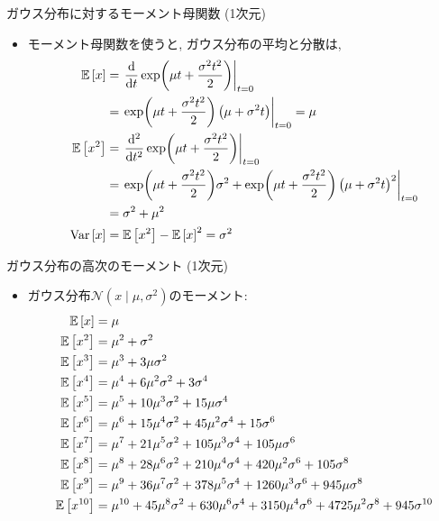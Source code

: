 \documentclass[dvipdfmx,notheorems,t]{beamer}
\begin{document}
\begin{frame}{ガウス分布に対するモーメント母関数 (1次元)}
\begin{itemize}
  \item モーメント母関数を使うと, ガウス分布の平均と分散は,
  \begin{align*}
    \operatorname{\mathbb{E}} \left[ x \right] &= \left. \dv{t} \exp(\mu t + \frac{\sigma^2 t^2}{2}) \right|_{t = 0} \\
      &= \left. \exp(\mu t + \frac{\sigma^2 t^2}{2}) \left( \mu + \sigma^2 t \right) \right|_{t = 0}
      = \mu \\
    \operatorname{\mathbb{E}} \left[ x^2 \right] &= \left. \dv[2]{t} \exp(\mu t + \frac{\sigma^2 t^2}{2}) \right|_{t = 0} \\
      &= \left. \exp(\mu t + \frac{\sigma^2 t^2}{2}) \sigma^2 +
        \exp(\mu t + \frac{\sigma^2 t^2}{2}) \left( \mu + \sigma^2 t \right)^2 \right|_{t = 0} \\
      &= \sigma^2 + \mu^2 \\
    \operatorname{Var} \left[ x \right] &= \operatorname{\mathbb{E}} \left[ x^2 \right] - \operatorname{\mathbb{E}} \left[ x \right]^2 = \sigma^2
  \end{align*}
\end{itemize}
\end{frame}

\begin{frame}{ガウス分布の高次のモーメント (1次元)}
\begin{itemize}
  \item ガウス分布$\mathcal{N}(x \mid \mu, \sigma^2)$のモーメント:
  \begin{align*}
    \operatorname{\mathbb{E}} \left[ x \right] &= \mu \\
    \operatorname{\mathbb{E}} \left[ x^2 \right] &= \mu^2 + \sigma^2 \\
    \operatorname{\mathbb{E}} \left[ x^3 \right] &= \mu^3 + 3 \mu \sigma^2 \\
    \operatorname{\mathbb{E}} \left[ x^4 \right] &= \mu^4 + 6 \mu^2 \sigma^2 + 3 \sigma^4 \\
    \operatorname{\mathbb{E}} \left[ x^5 \right] &= \mu^5 + 10 \mu^3 \sigma^2 + 15 \mu \sigma^4 \\
    \operatorname{\mathbb{E}} \left[ x^6 \right] &= \mu^6 + 15 \mu^4 \sigma^2 + 45 \mu^2 \sigma^4
      + 15 \sigma^6 \\
    \operatorname{\mathbb{E}} \left[ x^7 \right] &= \mu^7 + 21 \mu^5 \sigma^2 + 105 \mu^3 \sigma^4
      + 105 \mu \sigma^6 \\
    \operatorname{\mathbb{E}} \left[ x^8 \right] &= \mu^8 + 28 \mu^6 \sigma^2 + 210 \mu^4 \sigma^4
      + 420 \mu^2 \sigma^6 + 105 \sigma^8 \\
    \operatorname{\mathbb{E}} \left[ x^9 \right] &= \mu^9 + 36 \mu^7 \sigma^2 + 378 \mu^5 \sigma^4
      + 1260 \mu^3 \sigma^6 + 945 \mu \sigma^8 \\
    \operatorname{\mathbb{E}} \left[ x^{10} \right] &= \mu^{10} + 45 \mu^8 \sigma^2 + 630 \mu^6 \sigma^4
      + 3150 \mu^4 \sigma^6 + 4725 \mu^2 \sigma^8 + 945 \sigma^{10}
  \end{align*}
\end{itemize}
\end{frame}
\end{document}
